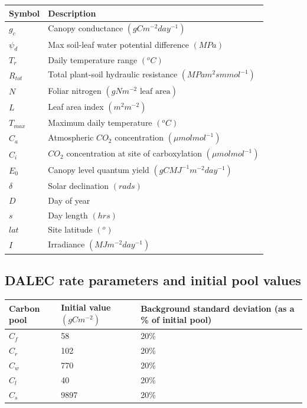 \documentclass[11pt]{article}
\begin{document}
\begin{center}
\begin{tabular}{| l | l |}
\hline
Symbol & Description \\ \hline
$g_c$ & Canopy conductance $(gCm^{-2}day^{-1})$ \\ \hline
$\psi_d$ & Max soil-leaf water potential difference $(MPa)$ \\ \hline
$T_r$ & Daily temperature range $( ^{o}C)$ \\ \hline
$R_{tot}$ & Total plant-soil hydraulic resistance $(MPa m^2s mmol^{-1})$ \\ \hline
$N$ & Foliar nitrogen $(gNm^{-2} \text{ leaf area})$  \\ \hline
$L$ & Leaf area index $(m^2 m^{-2})$ \\ \hline
$T_{max}$ & Maximum daily temperature $( ^{o}C)$  \\ \hline
$C_a$ & Atmospheric $CO_2$ concentration $(\mu mol mol^{-1})$ \\ \hline
$C_i$ & $CO_2$ concentration at site of carboxylation $(\mu mol mol^{-1})$ \\ \hline
$E_0$ & Canopy level quantum yield $(gCMJ^{-1}m^{-2}day^{-1})$ \\ \hline
$\delta$ & Solar declination $(rads)$ \\ \hline
$D$ & Day of year \\ \hline
$s$ & Day length $(hrs)$ \\  \hline  
$lat$ & Site latitude $( ^{o})$ \\ \hline
$I$ & Irradiance $(MJm^{-2}day^{-1})$ \\ 
\hline
\end{tabular}    
\end{center}

\subsection*{DALEC rate parameters and initial pool values}

\begin{center}
\begin{tabular}{| l | l | l |}
\hline
Carbon pool & Initial value $(gCm^{-2})$ & Background standard deviation (as a \% of initial pool) \\ \hline
$C_f$ & 58 & 20\% \\ \hline
$C_r$ & 102 & 20\% \\ \hline
$C_w$ & 770 & 20\% \\ \hline
$C_l$ & 40 & 20\% \\ \hline
$C_s$ & 9897 & 20\% \\ 
\hline
\end{tabular}    
\end{center}
\end{document}
